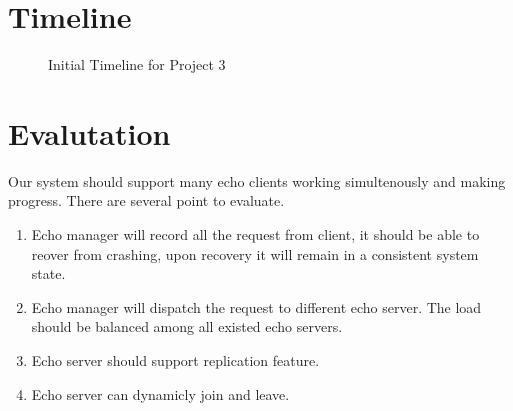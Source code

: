 \documentclass[12pt]{article}
\begin{document}
\section{Timeline}
\begin{figure}[H]
\caption{Initial Timeline for Project 3}
\label{fig:speciation}
\end{figure}

\section{Evalutation}
Our system should support many echo clients working simultenously and   
making progress. There are several point to evaluate.
\begin{enumerate}
  \item Echo manager will record all the request from client, it 
    should be able to reover from crashing, upon recovery
    it will remain in a consistent system state. 
  \item Echo manager will dispatch the request to different echo server. The 
    load should be balanced among all existed echo servers.
  \item Echo server should support replication feature. 
  \item Echo server can dynamicly join and leave.
\end{enumerate}
\end{document}

